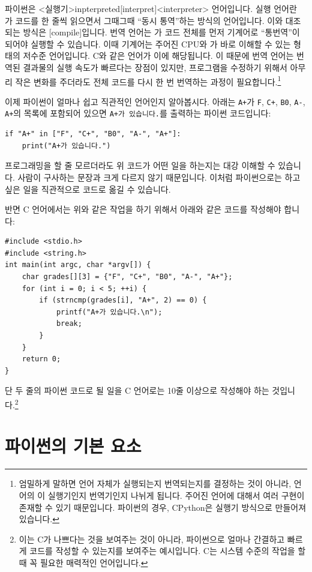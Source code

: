 \documentclass[../main.tex]{subfiles}
\begin{document}
파이썬은 <실행기>{inpterpreted}[interpret]<interpreter> 언어입니다.
실행 언어란 가 코드를 한 줄씩 읽으면서 그때그때 ``동시 통역''하는 방식의 언어입니다.
이와 대조되는 방식은 [compile]입니다.
번역 언어는 가 코드 전체를 먼저 기계어로 ``통번역''이 되어야 실행할 수 있습니다.
이때 기계어는 주어진 CPU와 가 바로 이해할 수 있는 형태의 저수준 언어입니다.
C와 같은 언어가 이에 해당됩니다.
이 때문에 번역 언어는 번역된 결과물의 실행 속도가 빠르다는 장점이 있지만, 프로그램을 수정하기 위해서 아무리 작은 변화를 주더라도 전체 코드를 다시 한 번 번역하는 과정이 필요합니다.\footnote{엄밀하게 말하면 언어 자체가 실행되는지 번역되는지를 결정하는 것이 아니라, 언어의 이 실행기인지 번역기인지 나뉘게 됩니다. 주어진 언어에 대해서 여러 구현이 존재할 수 있기 때문입니다. 파이썬의 경우, CPython은 실행기 방식으로 만들어져 있습니다.}

이제 파이썬이 얼마나 쉽고 직관적인 언어인지 알아봅시다.
아래는 \verb/A+/가 \verb/F/, \verb/C+/, \verb/B0/, \verb/A-/, \verb/A+/의 목록에 포함되어 있으면 \verb/A+가 있습니다./를 출력하는 파이썬 코드입니다:
\begin{verbatim}
if "A+" in ["F", "C+", "B0", "A-", "A+"]:
    print("A+가 있습니다.")
\end{verbatim}
프로그래밍을 할 줄 모르더라도 위 코드가 어떤 일을 하는지는 대강 이해할 수 있습니다.
사람이 구사하는 문장과 크게 다르지 않기 때문입니다.
이처럼 파이썬으로는 하고 싶은 일을 직관적으로 코드로 옮길 수 있습니다.

반면 C 언어에서는 위와 같은 작업을 하기 위해서 아래와 같은 코드를 작성해야 합니다:
\begin{verbatim}
#include <stdio.h>
#include <string.h>
int main(int argc, char *argv[]) {
    char grades[][3] = {"F", "C+", "B0", "A-", "A+"};
    for (int i = 0; i < 5; ++i) {
        if (strncmp(grades[i], "A+", 2) == 0) {
            printf("A+가 있습니다.\n");
            break;
        }
    }
    return 0;
}
\end{verbatim}
단 두 줄의 파이썬 코드로 될 일을 C 언어로는 10줄 이상으로 작성해야 하는 것입니다.\footnote{이는 C가 나쁘다는 것을 보여주는 것이 아니라, 파이썬으로 얼마나 간결하고 빠르게 코드를 작성할 수 있는지를 보여주는 예시입니다. C는 시스템 수준의 작업을 할 때 꼭 필요한 매력적인 언어입니다.}

\section{파이썬의 기본 요소}
\end{document}
